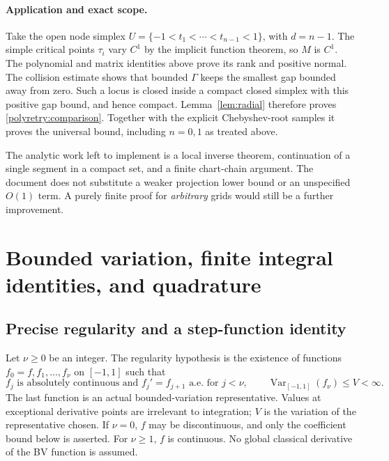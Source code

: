 \documentclass[11pt]{article}
\newcommand{\Var}{\operatorname{Var}}
\theoremstyle{remark}\newtheorem{remark}[theorem]{Remark}
\begin{document}
\paragraph{Application and exact scope.}
Take the open node simplex
$U=\{-1<t_1<\cdots<t_{n-1}<1\}$, with $d=n-1$. The simple critical
points $\tau_i$ vary $C^1$ by the implicit function theorem, so $M$ is
$C^1$. The polynomial and matrix identities above prove its rank and
positive normal. The collision estimate shows that bounded $\Gamma$
keeps the smallest gap bounded away from zero. Such a locus is closed
inside a compact closed simplex with this positive gap bound, and hence
compact. Lemma~\ref{lem:radial} therefore proves
\eqref{polyretry:comparison}. Together with the explicit Chebyshev-root
samples it proves the universal bound, including $n=0,1$ as treated above.

The analytic work left to implement is a local inverse theorem, continuation
of a single segment in a compact set, and a finite chart-chain argument.
The document does not substitute a weaker projection lower bound or an
unspecified $O(1)$ term. A purely finite proof for \emph{arbitrary} grids
would still be a further improvement.


\section{Bounded variation, finite integral identities, and quadrature}
\label{sec:bv}
\subsection{Precise regularity and a step-function identity}
Let $\nu\ge0$ be an integer. The regularity hypothesis is the existence
of functions $f_0=f,f_1,\ldots,f_\nu$ on $[-1,1]$ such that
\begin{equation}\label{eq:regularity}
 f_j\text{ is absolutely continuous and }f_j'=f_{j+1}
 \text{ a.e. for }j<\nu,
 \qquad \Var_{[-1,1]}(f_\nu)\le V<\infty.
\end{equation}
The last function is an actual bounded-variation representative. Values
at exceptional derivative points are irrelevant to integration; $V$ is
the variation of the representative chosen. If $\nu=0$, $f$ may be
discontinuous, and only the coefficient bound below is asserted.
For $\nu\ge1$, $f$ is continuous. No global classical derivative of the
BV function is assumed.
\end{document}
